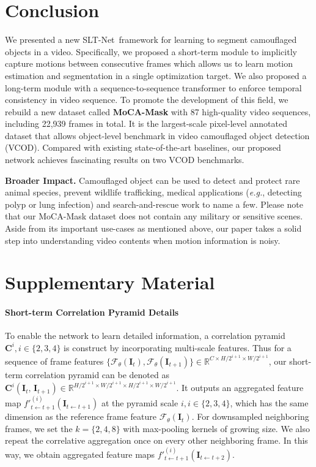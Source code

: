\documentclass[10pt,twocolumn,letterpaper]{article}
\def\eg{\emph{e.g.}}
\def\Ourmodel{SLT-Net}
\begin{document}
\section{Conclusion}
We presented a new \Ourmodel~framework for learning to segment camouflaged objects in a video. Specifically, we proposed a short-term module to implicitly capture motions between consecutive frames which allows us to learn motion estimation and segmentation in a single optimization target. We also proposed a long-term module with a sequence-to-sequence transformer to enforce temporal consistency in video sequence. 
To promote the development of this field, we rebuild a new dataset called \textbf{MoCA-Mask} with 87 high-quality video sequences, including 22,939 frames in total. It is the largest-scale pixel-level annotated dataset that allows object-level benchmark in video camouflaged object detection (VCOD). Compared with existing state-of-the-art baselines, our proposed network achieves fascinating results on two VCOD benchmarks. 


\textbf{Broader Impact.}  
Camouflaged object can be used to detect and protect rare animal species, prevent wildlife trafficking, medical applications (\eg, detecting polyp or lung infection) and search-and-rescue work to name a few. Please note that our MoCA-Mask dataset does not contain any military or sensitive scenes. Aside from its important use-cases as mentioned above, our paper takes a solid step into understanding video contents when motion information is noisy.

{\small


}

\clearpage




\section{Supplementary Material}

\paragraph{Short-term Correlation Pyramid Details}
To enable the network to learn detailed information, a correlation pyramid $\mathbf{C}^{i}, i \in \{2, 3, 4\}$ is construct by incorporating multi-scale features. Thus for a sequence of frame features   $\{\mathcal{F}_\theta(\mathbf{I}_{t}) , \mathcal{F}_\theta(\mathbf{I}_{t+1}) \} \in \mathbb{R}^{C \times H/2^{i+1} \times W/2^{i+1}}$, our short-term correlation pyramid can be denoted as $\mathbf{C}^i(\mathbf{I}_t,\,\mathbf{I}_{t+1}) \in \mathbb{R}^{ H/2^{i+1} \times W/2^{i+1} \times  H/2^{i+1} \times W/2^{i+1} }$. It outputs an aggregated feature map $f'^{(i)}_{t \leftarrow t+1 }(\mathbf{I}_{t\leftarrow t+1})$ at the pyramid scale $i, i \in \{2, 3, 4\}$, which has the same dimension as the reference frame feature $\mathcal{F}_{\theta}(\mathbf{I}_t)$. For downsampled neighboring frames, we set the $k=\{2,4,8\}$ with max-pooling kernels of growing size. We also repeat the correlative aggregation once on every other neighboring frame. In this way, we obtain aggregated feature maps $f'^{(i)}_{t \leftarrow t+1 }(\mathbf{I}_{t\leftarrow t+2})$. 
\end{document}
